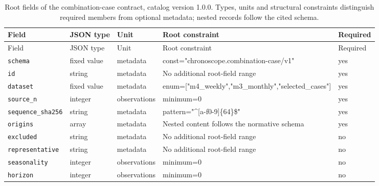 \begingroup\small
\begin{longtable}{@{}p{}p{}p{}p{}p{}@{}}
\caption{Root fields of the combination-case contract, catalog version 1.0.0. Types, units and structural constraints distinguish required members from optional metadata; nested records follow the cited schema.}\label{tab:contract-combination-case}\\
\toprule Field & JSON type & Unit & Root constraint & Required\\\midrule\endfirsthead
\toprule Field & JSON type & Unit & Root constraint & Required\\\midrule\endhead
\texttt{schema} & fixed value & metadata & const="chronosco\allowbreak{}pe.combination-c\allowbreak{}ase/v1" & yes\\
\texttt{id} & string & metadata & No additional root-field range & yes\\
\texttt{dataset} & fixed value & metadata & enum=["m4\_\allowbreak{}weekly","m3\_\allowbreak{}monthly","selected\_\allowbreak{}cases"] & yes\\
\texttt{source\_\allowbreak{}n} & integer & observations & minimum=0 & yes\\
\texttt{sequence\_\allowbreak{}sha256} & string & metadata & pattern="\textasciicircum{}[a-f0-9]\{64\}\$" & yes\\
\texttt{origins} & array & metadata & Nested content follows the normative schema & yes\\
\texttt{excluded} & string & metadata & No additional root-field range & no\\
\texttt{representative} & string & metadata & No additional root-field range & no\\
\texttt{seasonality} & integer & observations & minimum=0 & no\\
\texttt{horizon} & integer & observations & minimum=0 & no\\
\bottomrule
\end{longtable}
\endgroup
